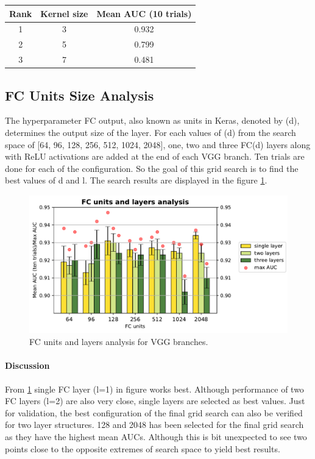 \begin{center}
  \begin{tabular}{|c c c|} 
   \hline\hline
   \rowcolor{lightgrey}
   Rank & Kernel size & Mean AUC (10 trials) \\[0.5ex] 
   \hline
   1 & 3 & 0.932\\   
   \hline
   2 & 5 & 0.799\\   
   \hline
   3 & 7 & 0.481\\   
   \hline \hline
  \end{tabular}
 \label{table:kernel_size}
\end{center}

\subsection{FC Units Size Analysis} 
The hyperparameter FC output, also known as units in Keras, denoted by (d), determines the output size of the layer. For each values of (d) from the search space of [64, 96, 128, 256, 512, 1024, 2048], one, two and three FC(d) 
layers along with ReLU activations are added at the end of each VGG branch. Ten trials are done for each of the configuration.  
So the goal of this grid search is to find the best values of d and l. The search results are displayed in the figure \ref{fig:contrastive_loss_dense_bar}.

\begin{figure}[ht]
\centering
\includegraphics[width= 13cm,height=6cm]{images/contrastive/contrastive_loss_dense_bar}
\caption{FC units and layers analysis for VGG branches.}
\label{fig:contrastive_loss_dense_bar}
\end{figure}

\paragraph{Discussion\\}
From \ref{fig:contrastive_loss_dense_bar} single FC layer (l=1) in figure works best. Although performance of two FC layers (l=2) are also very close, single layers are selected as best values. Just for validation,
the best configuration of the final grid search can also be verified for two layer structures.
128 and 2048 has been selected for the final grid search as they have the highest mean AUCs. Although this is bit unexpected to see two points close to the opposite extremes of search space to yield best results.

